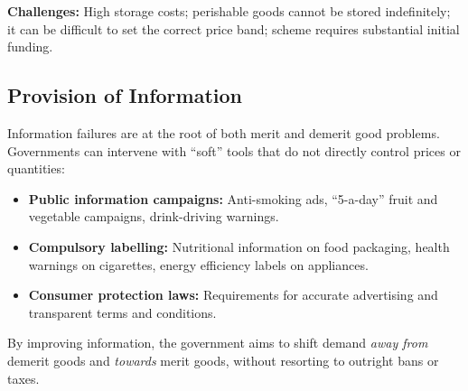 \documentclass[11pt, a4paper, twoside]{book}
\begin{document}
\textbf{Challenges:} High storage costs; perishable goods cannot be stored indefinitely; it can be difficult to set the correct price band; scheme requires substantial initial funding.

\subsection{Provision of Information}

Information failures are at the root of both merit and demerit good problems. Governments can intervene with ``soft'' tools that do not directly control prices or quantities:

\begin{itemize}
  \item \textbf{Public information campaigns:} Anti-smoking ads, ``5-a-day'' fruit and vegetable campaigns, drink-driving warnings.
  \item \textbf{Compulsory labelling:} Nutritional information on food packaging, health warnings on cigarettes, energy efficiency labels on appliances.
  \item \textbf{Consumer protection laws:} Requirements for accurate advertising and transparent terms and conditions.
\end{itemize}

By improving information, the government aims to shift demand \emph{away from} demerit goods and \emph{towards} merit goods, without resorting to outright bans or taxes.
\end{document}
